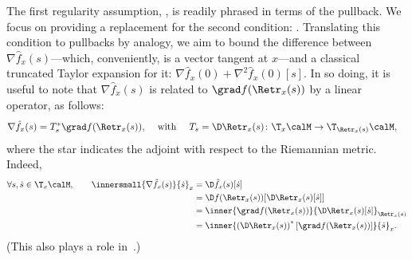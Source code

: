 The first regularity assumption, , is readily phrased in terms of the pullback. We focus on providing a replacement for the second condition: . Translating this condition to pullbacks by analogy, we aim to bound the difference between $\nabla \hat f_x(s)$---which, conveniently, is a vector tangent at $x$---and a classical truncated Taylor expansion for it: $\nabla \hat f_x(0) + \nabla^2 \hat f_x(0)[s]$. In so doing, it is useful to note that $\nabla \hat f_x(s)$ is related to $\grad f(\Retr_x(s))$ by a linear operator, as follows:
\begin{align}
	\nabla \hat f_x(s) & = T_s^* \grad f(\Retr_x(s)), & \textrm{ with } & & T_s & = \D\Retr_x(s) \colon \T_x\calM \to \T_{\Retr_x(s)}\calM,
	\label{eq:nablahatfTgradf}
\end{align}
where the star indicates the adjoint with respect to the Riemannian metric. Indeed,
\begin{align}
	\forall s, \dot s \in \T_x\calM, \qquad \innersmall{\nabla \hat f_x(s)}{\dot s}_x & = \D \hat f_x(s)[\dot s] \nonumber\\
		& = \D f(\Retr_{x}(s))[ \D\Retr_{x}(s)[\dot s] ] \nonumber\\
		& = \inner{\grad f(\Retr_{x}(s))}{\D\Retr_{x}(s)[\dot s]}_{\Retr_{x}(s)} \nonumber\\
		& = \inner{\left(\D\Retr_{x}(s)\right)^*[\grad f(\Retr_{x}(s))]}{\dot s}_x.
		\label{eq:DRetrnablagrad}
\end{align}
(This also plays a role in~\citep[p599]{ring2012optimization}.)


